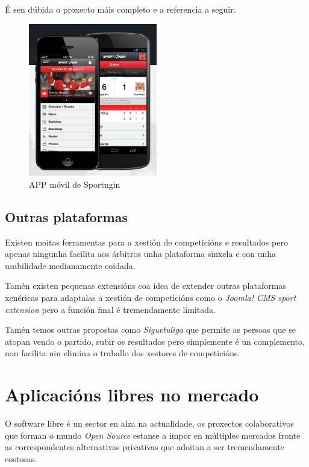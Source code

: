     É sen dúbida o proxecto máis completo e a referencia a seguir.
 
    \begin{figure}[h!]
      \begin{center}
	\includegraphics[width=0.5\textwidth]{./img/sportngin-app.png}
	\caption{APP móvil de Sportngin}
      \end{center}
    \end{figure}

\clearpage

    \subsection{Outras plataformas}
    Existen moitas ferramentas para a xestión de competicións e resultados pero apenas 
ningunha facilita aos árbitros unha plataforma sinxela e con unha usabilidade 
medianamente coidada.
    
    Tamén existen pequenas extensións coa idea de extender outras plataformas xenéricas 
para adaptalas a xestión de competicións como o \emph{Joomla! CMS sport extension} pero a 
función final é tremendamente limitada.
  
    Tamén temos outras propostas como \emph{Siguetuliga} que permite as persoas que 
se atopan vendo o partido, subir os resultados pero simplemente é un complemento, non 
facilita nin elimina o traballo dos xestores de competicións.

  \section{Aplicacións libres no mercado}
  
    O software libre é un sector en alza na actualidade, os proxectos colaborativos que 
forman o mundo \emph{Open Source} estanse a impor en múltiples mercados fronte as 
correspondentes alternativas privativas que adoitan a ser tremendamente costosas.

